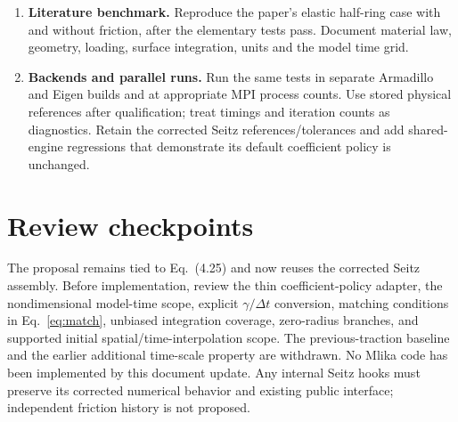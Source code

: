 \documentclass[11pt,a4paper]{article}
\begin{document}
\begin{enumerate}[leftmargin=*]
geometry/loading in a separate Mlika driver configuration that leaves the
existing Seitz cases unchanged. Add the precompressed two-block shear loading
cycle for deliberate sticking, sliding, unloading and reversal. Add a multislab
adjoint check for a geometric ADV and a material/property ADV. Use independent
FD sweeps and the same physical configuration across solver/backend variants.
\item \textbf{Literature benchmark.} Reproduce the paper's elastic half-ring
case with and without friction, after the elementary tests pass. Document
material law, geometry, loading, surface integration, units and the model time grid.
\item \textbf{Backends and parallel runs.} Run the same tests in separate
Armadillo and Eigen builds and at appropriate MPI process counts. Use stored
physical references after qualification; treat timings and iteration counts as
diagnostics. Retain the corrected Seitz references/tolerances and add shared-engine
regressions that demonstrate its default coefficient policy is unchanged.
\end{enumerate}

\section{Review checkpoints}
The proposal remains tied to Eq.~(4.25) and now reuses the corrected Seitz
assembly. Before implementation, review the thin coefficient-policy adapter,
the nondimensional model-time scope, explicit $\gamma/\Delta t$ conversion,
matching conditions in Eq.~\eqref{eq:match}, unbiased integration coverage,
zero-radius branches, and supported initial spatial/time-interpolation scope.
The previous-traction baseline and the earlier additional time-scale property
are withdrawn. No Mlika code has been implemented by this document update.
Any internal Seitz hooks must preserve its corrected numerical behavior and
existing public interface; independent friction history is not proposed.
\end{document}
